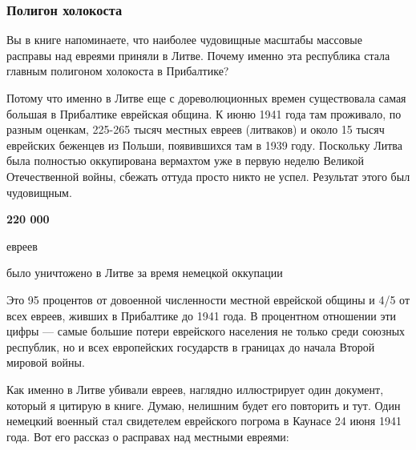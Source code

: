  
 
 
 
 

\subsubsection{Полигон холокоста}
\label{sec:02_12_2020.news.ru.lenta_ru.mozzhuhin_andrei.1.pribaltika.poligon_holokosta}

Вы в книге напоминаете, что наиболее чудовищные масштабы массовые расправы над
евреями приняли в Литве. Почему именно эта республика стала главным полигоном
холокоста в Прибалтике?

Потому что именно в Литве еще с дореволюционных времен существовала самая
большая в Прибалтике еврейская община. К июню 1941 года там проживало, по
разным оценкам, 225-265 тысяч местных евреев (литваков) и около 15 тысяч
еврейских беженцев из Польши, появившихся там в 1939 году. Поскольку Литва была
полностью оккупирована вермахтом уже в первую неделю Великой Отечественной
войны, сбежать оттуда просто никто не успел. Результат этого был чудовищным.

\begin{leftbar}
	\bfseries
	\centering
{\Large\color{orange}220 000}\par
				{\large евреев}\par
было уничтожено в Литве за время немецкой оккупации
\end{leftbar}

Это 95 процентов от довоенной численности местной еврейской общины и 4/5 от
всех евреев, живших в Прибалтике до 1941 года. В процентном отношении эти цифры
— самые большие потери еврейского населения не только среди союзных республик,
но и всех европейских государств в границах до начала Второй мировой войны.

Как именно в Литве убивали евреев, наглядно иллюстрирует один документ, который
я цитирую в книге. Думаю, нелишним будет его повторить и тут. Один немецкий
военный стал свидетелем еврейского погрома в Каунасе 24 июня 1941 года. Вот его
рассказ о расправах над местными евреями:

